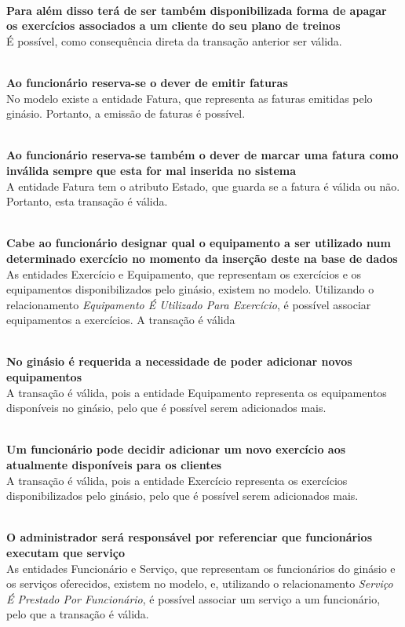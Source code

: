 \noindent
\\\textbf{Para além disso terá de ser também disponibilizada forma de apagar os exercícios associados a um cliente do seu plano de treinos}
\\ É possível, como consequência direta da transação anterior ser válida.

\noindent
\\\textbf{Ao funcionário reserva-se o dever de emitir faturas}
\\ No modelo existe a entidade Fatura, que representa as faturas emitidas pelo ginásio. Portanto, a emissão de faturas é possível.

\noindent
\\\textbf{Ao funcionário reserva-se também o dever de marcar uma fatura como inválida sempre que esta for mal inserida no sistema}
\\ A entidade Fatura tem o atributo Estado, que guarda se a fatura é válida ou não. Portanto, esta transação é válida.

\noindent
\\\textbf{Cabe ao funcionário designar qual o equipamento a ser utilizado num determinado exercício no momento da inserção deste na base de dados}
\\ As entidades Exercício e Equipamento, que representam os exercícios e os equipamentos disponibilizados pelo ginásio, existem no modelo. Utilizando o relacionamento \emph{Equipamento É Utilizado Para Exercício}, é possível associar equipamentos a exercícios. A transação é válida

\noindent
\\\textbf{No ginásio é requerida a necessidade de poder adicionar novos equipamentos}
\\ A transação é válida, pois a entidade Equipamento representa os equipamentos disponíveis no ginásio, pelo que é possível serem adicionados mais.

\noindent
\\\textbf{Um funcionário pode decidir adicionar um novo exercício aos atualmente disponíveis para os clientes}
\\ A transação é válida, pois a entidade Exercício representa os exercícios disponibilizados pelo ginásio, pelo que é possível serem adicionados mais.

\noindent
\\\textbf{O administrador será responsável por referenciar que funcionários executam que serviço}
\\ As entidades Funcionário e Serviço, que representam os funcionários do ginásio e os serviços oferecidos, existem no modelo, e, utilizando o relacionamento \emph{Serviço É Prestado Por Funcionário}, é possível associar um serviço a um funcionário, pelo que a transação é válida.
